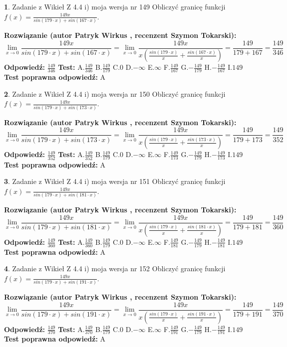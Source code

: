\documentclass[12pt, a4paper]{article}
\theoremstyle{definition} %
\newtheorem{zad}{}
\newcommand{\zadStart}[1]{\begin{zad}#1\newline}
\newcommand{\zadStop}{\end{zad}}
\newcommand{\rozwStart}[2]{\noindent \textbf{Rozwiązanie (autor #1 , recenzent #2): }\newline}
\newcommand{\rozwStop}{\newline}
\newcommand{\odpStart}{\noindent \textbf{Odpowiedź:}\newline}
\newcommand{\odpStop}{\newline}
\newcommand{\testStart}{\noindent \textbf{Test:}\newline}
\newcommand{\testStop}{\newline}
\newcommand{\kluczStart}{\noindent \textbf{Test poprawna odpowiedź:}\newline}
\newcommand{\kluczStop}{\newline}
\begin{document}
\zadStart{Zadanie z Wikieł Z 4.4 i) moja wersja nr 149}
Obliczyć granicę funkcji $f(x)=\frac{149x}{sin(179\cdot x) +sin(167\cdot x)}$.
\zadStop
\rozwStart{Patryk Wirkus}{Szymon Tokarski}
$$\lim\limits_{x\to 0}\frac{149x}{sin(179\cdot x) +sin(167\cdot x)}=\lim\limits_{x\to 0}\frac{149x}{x(\frac{sin(179\cdot x)}{x}+\frac{sin(167\cdot x)}{x})}=\frac{149}{179+167} = \frac{149}{346}$$
\rozwStop
\odpStart
$\frac{149}{346}$
\odpStop
\testStart
A.$\frac{149}{346}$
B.$\frac{149}{179}$
C.$0$
D.$-\infty$
E.$\infty$
F.$\frac{149}{167}$
G.$-\frac{149}{179}$
H.$-\frac{149}{167}$
I.$149$
\testStop
\kluczStart
A
\kluczStop



\zadStart{Zadanie z Wikieł Z 4.4 i) moja wersja nr 150}
Obliczyć granicę funkcji $f(x)=\frac{149x}{sin(179\cdot x) +sin(173\cdot x)}$.
\zadStop
\rozwStart{Patryk Wirkus}{Szymon Tokarski}
$$\lim\limits_{x\to 0}\frac{149x}{sin(179\cdot x) +sin(173\cdot x)}=\lim\limits_{x\to 0}\frac{149x}{x(\frac{sin(179\cdot x)}{x}+\frac{sin(173\cdot x)}{x})}=\frac{149}{179+173} = \frac{149}{352}$$
\rozwStop
\odpStart
$\frac{149}{352}$
\odpStop
\testStart
A.$\frac{149}{352}$
B.$\frac{149}{179}$
C.$0$
D.$-\infty$
E.$\infty$
F.$\frac{149}{173}$
G.$-\frac{149}{179}$
H.$-\frac{149}{173}$
I.$149$
\testStop
\kluczStart
A
\kluczStop



\zadStart{Zadanie z Wikieł Z 4.4 i) moja wersja nr 151}
Obliczyć granicę funkcji $f(x)=\frac{149x}{sin(179\cdot x) +sin(181\cdot x)}$.
\zadStop
\rozwStart{Patryk Wirkus}{Szymon Tokarski}
$$\lim\limits_{x\to 0}\frac{149x}{sin(179\cdot x) +sin(181\cdot x)}=\lim\limits_{x\to 0}\frac{149x}{x(\frac{sin(179\cdot x)}{x}+\frac{sin(181\cdot x)}{x})}=\frac{149}{179+181} = \frac{149}{360}$$
\rozwStop
\odpStart
$\frac{149}{360}$
\odpStop
\testStart
A.$\frac{149}{360}$
B.$\frac{149}{179}$
C.$0$
D.$-\infty$
E.$\infty$
F.$\frac{149}{181}$
G.$-\frac{149}{179}$
H.$-\frac{149}{181}$
I.$149$
\testStop
\kluczStart
A
\kluczStop



\zadStart{Zadanie z Wikieł Z 4.4 i) moja wersja nr 152}
Obliczyć granicę funkcji $f(x)=\frac{149x}{sin(179\cdot x) +sin(191\cdot x)}$.
\zadStop
\rozwStart{Patryk Wirkus}{Szymon Tokarski}
$$\lim\limits_{x\to 0}\frac{149x}{sin(179\cdot x) +sin(191\cdot x)}=\lim\limits_{x\to 0}\frac{149x}{x(\frac{sin(179\cdot x)}{x}+\frac{sin(191\cdot x)}{x})}=\frac{149}{179+191} = \frac{149}{370}$$
\rozwStop
\odpStart
$\frac{149}{370}$
\odpStop
\testStart
A.$\frac{149}{370}$
B.$\frac{149}{179}$
C.$0$
D.$-\infty$
E.$\infty$
F.$\frac{149}{191}$
G.$-\frac{149}{179}$
H.$-\frac{149}{191}$
I.$149$
\testStop
\kluczStart
A
\kluczStop
\end{document}
